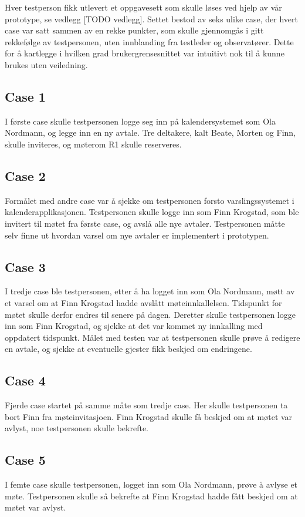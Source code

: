 Hver testperson fikk utlevert et oppgavesett som skulle løses ved hjelp av vår prototype, se vedlegg [TODO vedlegg]. Settet bestod av seks ulike case, der hvert case var satt sammen av en rekke punkter, som skulle gjennomgås i gitt rekkefølge av testpersonen, uten innblanding fra testleder og observatører. Dette for å kartlegge i hvilken grad brukergrensesnittet var intuitivt nok til å kunne brukes uten veiledning.

\subsection{Case 1}
	I første case skulle testpersonen logge seg inn på kalendersystemet som Ola Nordmann, og legge inn en ny avtale. Tre deltakere, kalt Beate, Morten og Finn, skulle inviteres, og møterom R1 skulle reserveres.

\subsection{Case 2}
	Formålet med andre case var å sjekke om testpersonen forsto varslingssystemet i kalenderapplikasjonen. Testpersonen skulle logge inn som Finn Krogstad, som ble invitert til møtet fra første case, og avslå alle nye avtaler. Testpersonen måtte selv finne ut hvordan varsel om nye avtaler er implementert i prototypen.

\subsection{Case 3}
	I tredje case ble testpersonen, etter å ha logget inn som Ola Nordmann, møtt av et varsel om at Finn Krogstad hadde avslått møteinnkallelsen. Tidspunkt for møtet skulle derfor endres til senere på dagen. Deretter skulle testpersonen logge inn som Finn Krogstad, og sjekke at det var kommet ny innkalling med oppdatert tidspunkt. Målet med testen var at testpersonen skulle prøve å redigere en avtale, og sjekke at eventuelle gjester fikk beskjed om endringene.

\subsection{Case 4}
	Fjerde case startet på samme måte som tredje case. Her skulle testpersonen ta bort Finn fra møteinvitasjoen. Finn Krogstad skulle få beskjed om at møtet var avlyst, noe testpersonen skulle bekrefte.

\subsection{Case 5}
	I femte case skulle testpersonen, logget inn som Ola Nordmann, prøve å avlyse et møte. Testpersonen skulle så bekrefte at Finn Krogstad hadde fått beskjed om at møtet var avlyst.

